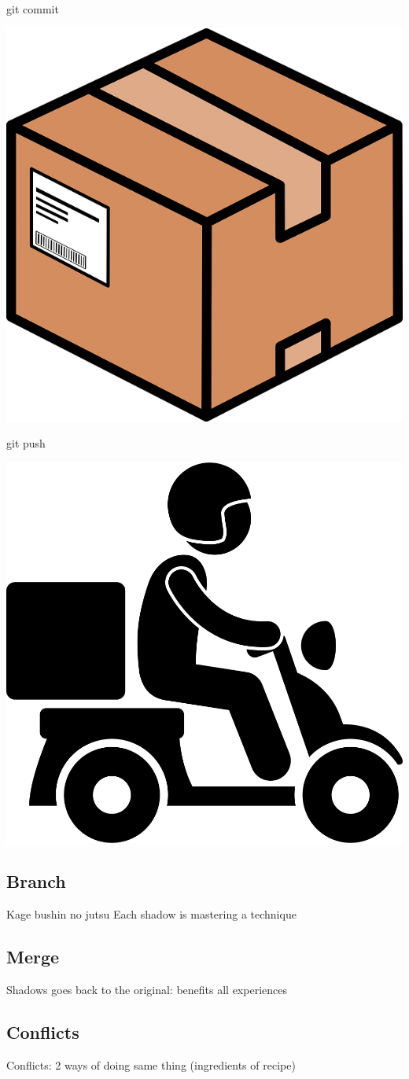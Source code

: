 \documentclass{beamer}
\begin{document}
\begin{frame}{git commit}
    \begin{center}
        \includegraphics[width=0.5\linewidth]{img/commit.png}
    \end{center}
\end{frame}

\begin{frame}{git push}
    \begin{center}
        \includegraphics[width=0.5\linewidth]{img/push.png}
    \end{center}
\end{frame}

\subsection{Branch}

Kage bushin no jutsu
Each shadow is mastering a technique

\subsection{Merge}

Shadows goes back to the original: benefits all experiences

\subsection{Conflicts}

Conflicts: 2 ways of doing same thing (ingredients of recipe)
\end{document}
